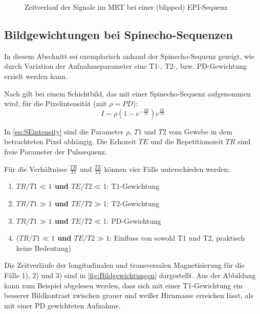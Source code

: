 \begin{figure}[H]
	\centering
	\caption[Echoplanar Sequenz]{Zeitverlauf der Signale im MRT bei einer (blipped) EPI-Sequenz}
	\label{fig:EPIseq}
\end{figure}



\subsection{Bildgewichtungen bei Spinecho-Sequenzen}
\label{sec:gewichtung}
In diesem Abschnitt sei exemplarisch anhand der Spinecho-Sequenz gezeigt, wie durch Variation der Aufnahmeparameter eine T1-, T2-, bzw. PD-Gewichtung erzielt werden kann.

Nach \cite{Bushberg2011} gilt bei einem Schichtbild, das mit einer Spinecho-Sequenz aufgenommen wird, für die Pixelintensität (mit $\rho=PD$):
\begin{equation}
\label{eq:SEintensity}
	I \sim \rho \left(1-e^{-\frac{TR}{T1}}\right) e^{\frac{TE}{T2}}
\end{equation}

In \autoref{eq:SEintensity} sind die Parameter $\rho$, $T1$ und $T2$ vom Gewebe in dem betrachteten Pixel abhängig. Die Echozeit $TE$ und die Repetitionszeit $TR$ sind freie Parameter der Pulssequenz.

Für die Verhältnisse $\frac{TR}{T1}$ und $\frac{TE}{T2}$ können vier Fälle unterschieden werden:

\begin{enumerate}
	\item \textbf{$TR/T1\ll1$ und $TE/T2\ll1$}: T1-Gewichtung
	\item \textbf{$TR/T1\gg1$ und $TE/T2\gg1$}: T2-Gewichtung
	\item \textbf{$TR/T1\gg1$ und $TE/T2\ll1$}: PD-Gewichtung
	\item (\textbf{$TR/T1\ll1$ und $TE/T2\gg1$}: Einfluss von sowohl T1 und T2, praktisch keine Bedeutung)
\end{enumerate}
Die Zeitverläufe der longitudinalen und transversalen Magnetisierung für die Fälle 1), 2) und 3) sind in \autoref{fig:Bildgewichtungen} dargestellt. Aus der Abbildung kann zum Beispiel abgelesen werden, dass sich mit einer T1-Gewichtung ein besserer Bildkontrast zwischen grauer und weißer Hirnmasse erreichen lässt, als mit einer PD gewichteten Aufnahme.

